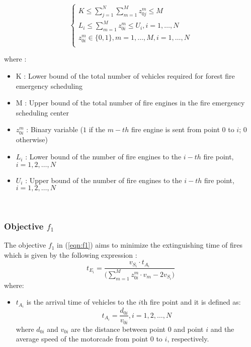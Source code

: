 \begin{equation}
    \label{eqn:constraints}
    \begin{cases}
        K \leq \sum_{j=1}^N \sum_{m=1}^M z_{0j}^m \leq M\\
        L_i \leq \sum_{m=1}^M z_{0i}^m \leq U_i, i=1, \dots, N\\
        z_{0i}^m \in \{0,1\}, m=1,\dots,M , i=1,\dots, N\\
    \end{cases}
\end{equation}

where :
\begin{itemize}
    \item K : Lower bound of the total number of vehicles required for forest fire emergency scheduling
    \item M : Upper bound of the total number of fire engines in the fire emergency scheduling center
    \item $z_{0i}^m$ : Binary variable ($1$ if the $m-th$ fire engine is sent from point $0$ to $i$; $0$ otherwise)
    \item $L_i$ : Lower bound of the number of fire engines to the $i-th$ fire point, $i = 1,2,\dots,N$
    \item $U_i$ : Upper bound of the number of fire engines to the $i-th$ fire point, $i = 1,2,\dots,N$
\end{itemize}
\mbox{}\\

\subsubsection{Objective $f_1$}
The objective $f_1$ in (\ref{eqn:f1}) aims to minimize the extinguishing time of fires which is given by the following expression :
\begin{equation}
    \label{eqn:tei}
    t_{E_i} = \dfrac{v_{S_i}\cdot t_{A_i}}{\biggr(\sum_{m=1}^M z_{0i}^m \cdot v_m - 2v_{S_i} \biggl)}
\end{equation}
where:
\begin{itemize}
    \item $t_{A_i}$ is the arrival time of vehicles to the $i$th fire point and it is defined as:
        \begin{equation}
        t_{A_i}=\dfrac{d_{0i}}{v_{0i}}, i=1,2, \dots, N
    \end{equation}
        where $d_{0i}$ and $v_{0i}$ are the distance between point $0$ and point $i$ and the average speed of the motorcade from point $0$ to $i$, respectively.
\end{itemize}

